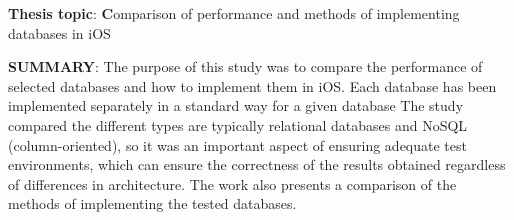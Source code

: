 \textbf{Thesis topic}: \textbf Comparison of performance and methods of implementing databases in iOS\par
\textbf{SUMMARY}: The purpose of this study was to compare the performance of selected databases and how to implement them in iOS. Each database has been implemented separately in a standard way for a given database The study compared the different types are typically relational databases and NoSQL (column-oriented), so it was an important aspect of ensuring adequate test environments, which can ensure the correctness of the results obtained regardless of differences in architecture. The work also presents a comparison of the methods of implementing the tested databases.